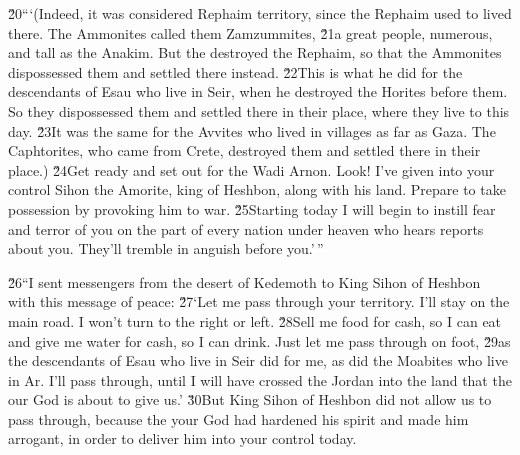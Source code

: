 \v{20}```(Indeed, it was considered Rephaim territory, since the Rephaim used to lived there. The Ammonites called them Zamzummites, \v{21}a great people, numerous, and tall as the Anakim. But the  destroyed the Rephaim, so that the Ammonites dispossessed them and settled there instead. \v{22}This is what he did for the descendants of Esau who live in Seir, when he destroyed the Horites before them. So they dispossessed them and settled there in their place, where they live to this day. \v{23}It was the same for the Avvites who lived in villages as far as Gaza. The Caphtorites, who came from Crete, destroyed them and settled there in their place.) \v{24}Get ready and set out for the Wadi Arnon. Look! I've given into your control Sihon the Amorite, king of Heshbon, along with his land. Prepare to take possession by provoking him to war. \v{25}Starting today I will begin to instill fear and terror of you on the part of every nation under heaven who hears reports about you. They'll tremble in anguish before you.'\,''

\v{26}``I sent messengers from the desert of Kedemoth to King Sihon of Heshbon with this message of peace: \v{27}`Let me pass through your territory. I'll stay on the main road. I won't turn to the right or left. \v{28}Sell me food for cash, so I can eat and give me water for cash, so I can drink. Just let me pass through on foot, \v{29}as the descendants of Esau who live in Seir did for me, as did the Moabites who live in Ar. I'll pass through, until I will have crossed the Jordan into the land that the  our God is about to give us.' \v{30}But King Sihon of Heshbon did not allow us to pass through, because the  your God had hardened his spirit and made him arrogant, in order to deliver him into your control today.

